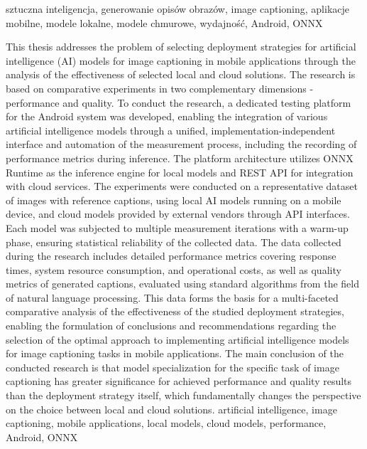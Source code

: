 \documentclass[
    bindingoffset=5mm,  %
    footnoteindent=3mm, %
    hyphenation=false    %
]{src/wut-thesis}
\begin{document}
\keywords sztuczna inteligencja, generowanie opisów obrazów, image captioning, aplikacje mobilne, modele lokalne, modele chmurowe, wydajność, Android, ONNX

\clearpage
\secondabstract 
This thesis addresses the problem of selecting deployment strategies for artificial intelligence (AI) models for image captioning in mobile applications
through the analysis of the effectiveness of selected local and cloud solutions.
The research is based on comparative experiments in two complementary dimensions - performance and quality.
To conduct the research, a dedicated testing platform for the Android system was developed, enabling the integration of various artificial intelligence models through a unified, implementation-independent 
interface and automation of the measurement process, including the recording of performance metrics during inference.
The platform architecture utilizes ONNX Runtime as the inference engine for local models and REST API for integration with cloud services.
The experiments were conducted on a representative dataset of images with reference captions, using local AI models running on a mobile device,
and cloud models provided by external vendors through API interfaces.
Each model was subjected to multiple measurement iterations with a warm-up phase, ensuring statistical reliability of the collected data.
The data collected during the research includes detailed performance metrics covering response times, system resource consumption, and 
operational costs, as well as quality metrics of generated captions, evaluated using standard algorithms from the field of natural language processing.
This data forms the basis for a multi-faceted comparative analysis of the effectiveness of the studied deployment strategies, enabling the formulation of conclusions
and recommendations regarding the selection of the optimal approach to implementing artificial intelligence models for image captioning tasks in mobile applications.
The main conclusion of the conducted research is that model specialization for the specific task of image captioning has greater significance 
for achieved performance and quality results than the deployment strategy itself, which fundamentally changes the perspective on the choice 
between local and cloud solutions. 
\secondkeywords artificial intelligence, image captioning, mobile applications, local models, cloud models, performance, Android, ONNX
\end{document}
